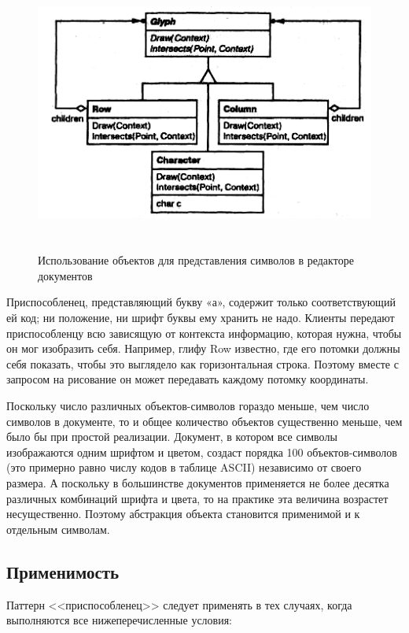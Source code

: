 \begin{figure}[htbp]
  \centering
  \includegraphics[width=150mm,height=92mm]{pic/glyph_uml}
  \caption{Использование объектов для представления символов в редакторе документов}
  \label{pic:glyph_uml}
\end{figure}

Приспособленец, представляющий букву «а», содержит только соответствующий ей код;
ни положение, ни шрифт буквы ему хранить не надо.
Клиенты передают приспособленцу всю зависящую от контекста информацию, которая нужна,
чтобы он мог изобразить себя. Например, глифу Row известно, где его потомки
должны себя показать, чтобы это выглядело как горизонтальная строка. Поэтому
вместе с запросом на рисование он может передавать каждому потомку координаты.

Поскольку число различных объектов-символов гораздо меньше, чем число
символов в документе, то и общее количество объектов существенно меньше, чем
было бы при простой реализации. 
Документ, в котором все символы изображаются одним шрифтом и цветом,
создаст порядка 100 объектов-символов (это примерно равно числу кодов в таблице ASCII)
независимо от своего размера. А поскольку в большинстве документов применяется
не более десятка различных комбинаций шрифта и цвета, то на практике эта величина
возрастет несущественно. Поэтому абстракция объекта становится применимой и к отдельным символам.

\subsection{Применимость}

Паттерн <<приспособленец>> следует применять в тех случаях,
когда выполняются все нижеперечисленные условия:


